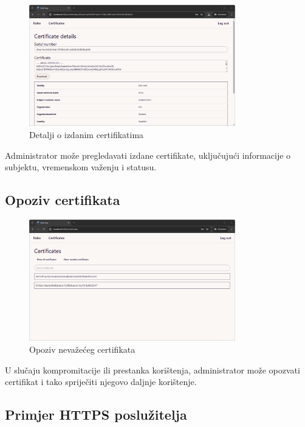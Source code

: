 \documentclass[]{foi}
\begin{document}
\begin{figure}[H]
    \centering
    \includegraphics[width=0.8\textwidth]{assets/certificate-details.png}
    \caption{Detalji o izdanim certifikatima}
\end{figure}

Administrator može pregledavati izdane certifikate, uključujući informacije o subjektu, vremenskom važenju i statusu.

\subsection{Opoziv certifikata}

\begin{figure}[H]
    \centering
    \includegraphics[width=0.8\textwidth]{assets/revoked.png}
    \caption{Opoziv nevažećeg certifikata}
\end{figure}

U slučaju kompromitacije ili prestanka korištenja, administrator može opozvati certifikat i tako spriječiti njegovo daljnje korištenje.

\subsection{Primjer HTTPS poslužitelja}
\end{document}
